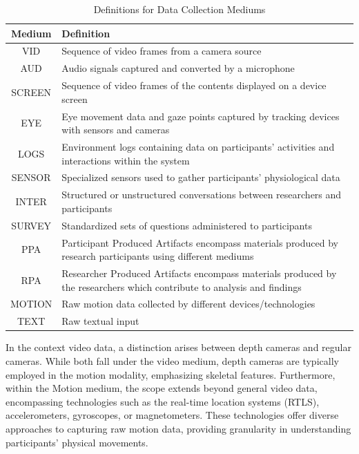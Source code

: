 \documentclass[manuscript,screen,review]{acmart}
\begin{document}
\begin{table}[ht]
  \centering
  \caption{Definitions for Data Collection Mediums}
  \begin{tabular}{|c|p{}|}
    \hline
    \textbf{Medium} & \textbf{Definition} \\
    \hline
    VID & Sequence of video frames from a camera source \\
    \hline
    AUD & Audio signals captured and converted by a microphone \\
    \hline
    SCREEN & Sequence of video frames of the contents displayed on a device screen \\
    \hline
    EYE & Eye movement data and gaze points captured by tracking devices with sensors and cameras \\
    \hline
    LOGS & Environment logs containing data on participants' activities and interactions within the system \\
    \hline
    SENSOR & Specialized sensors used to gather participants' physiological data \\
    \hline
    INTER & Structured or unstructured conversations between researchers and participants \\
    \hline
    SURVEY & Standardized sets of questions administered to participants \\
    \hline
    PPA & Participant Produced Artifacts encompass materials produced by research participants using different mediums \\
    \hline
    RPA & Researcher Produced Artifacts encompass materials produced by the researchers which contribute to analysis and findings \\
    \hline
    MOTION & Raw motion data collected by different devices/technologies \\
    \hline
    TEXT & Raw textual input \\
    \hline
  \end{tabular}
  \label{tab:data_collection_mediums}
\end{table}

In the context video data, a distinction arises between depth cameras and regular cameras. While both fall under the video medium, depth cameras are typically employed in the motion modality, emphasizing skeletal features. Furthermore, within the Motion medium, the scope extends beyond general video data, encompassing technologies such as the real-time location systems (RTLS), accelerometers, gyroscopes, or magnetometers. These technologies offer diverse approaches to capturing raw motion data, providing granularity in understanding participants' physical movements.
\end{document}
